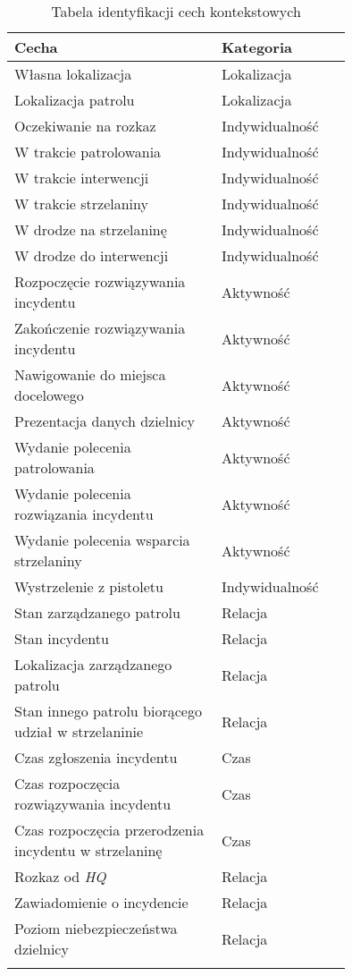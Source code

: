 \begin{longtable}{|p{0.5\linewidth}|p{0.25\linewidth}|}
    \hline
     Cecha & Kategoria \\
     \hline
     \hline
     Własna lokalizacja & Lokalizacja \\
     \hline
     Lokalizacja patrolu & Lokalizacja \\
     \hline
     Oczekiwanie na rozkaz & Indywidualność \\
     \hline
     W trakcie patrolowania & Indywidualność \\
     \hline
     W trakcie interwencji & Indywidualność \\
     \hline
     W trakcie strzelaniny & Indywidualność \\
     \hline
     W drodze na strzelaninę & Indywidualność \\
     \hline
     W drodze do interwencji & Indywidualność \\
     \hline
     Rozpoczęcie rozwiązywania incydentu & Aktywność \\
     \hline
     Zakończenie rozwiązywania incydentu & Aktywność \\
     \hline
     Nawigowanie do miejsca docelowego & Aktywność \\
     \hline
     Prezentacja danych dzielnicy & Aktywność \\
     \hline
     Wydanie polecenia patrolowania & Aktywność \\
     \hline
     Wydanie polecenia rozwiązania incydentu & Aktywność \\
     \hline
     Wydanie polecenia wsparcia strzelaniny & Aktywność \\
     \hline
     Wystrzelenie z pistoletu & Indywidualność \\
     \hline
     Stan zarządzanego patrolu & Relacja \\
     \hline
     Stan incydentu & Relacja \\
     \hline
     Lokalizacja zarządzanego patrolu & Relacja \\
     \hline
     Stan innego patrolu biorącego udział w strzelaninie & Relacja \\
     \hline
     Czas zgłoszenia incydentu & Czas \\
     \hline
     Czas rozpoczęcia rozwiązywania incydentu & Czas \\
     \hline
      Czas rozpoczęcia przerodzenia incydentu w strzelaninę & Czas \\
     \hline
      Rozkaz od \emph{HQ} & Relacja \\
     \hline
     Zawiadomienie o incydencie & Relacja \\
     \hline
     Poziom niebezpieczeństwa dzielnicy & Relacja \\
     \hline
\caption{Tabela identyfikacji cech kontekstowych}
\label{tab:agentsFeaturesCategorization}
\end{longtable}

